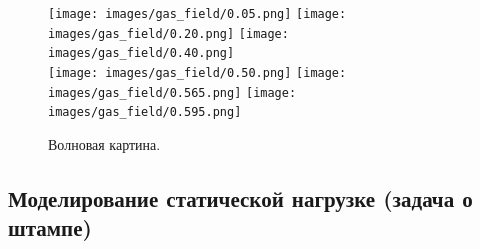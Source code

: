 \begin{center}
\end{center}

\begin{figure}[H]
    \centering
    \texttt{[image: images/gas\_field/0.05.png]}
    \texttt{[image: images/gas\_field/0.20.png]}
    \texttt{[image: images/gas\_field/0.40.png]}\\
    \texttt{[image: images/gas\_field/0.50.png]}
    \texttt{[image: images/gas\_field/0.565.png]}
    \texttt{[image: images/gas\_field/0.595.png]}
    \caption{Волновая картина.}
    \label{fig:wave_image}
\end{figure}

\subsection{Моделирование статической нагрузке (задача о штампе)}
